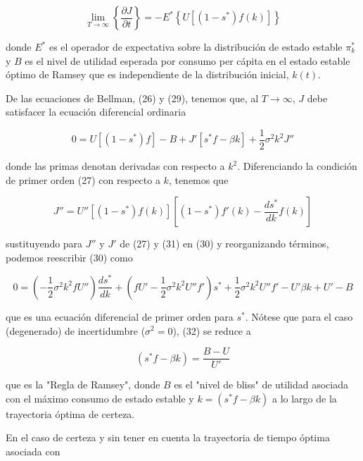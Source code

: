 \documentclass[a4paper,12pt]{article}
\begin{document}
		\begin{equation}
\lim_{T \to \infty} \left\{ \frac{\partial J}{\partial t} \right\} = -E^* \left\{ U[(1 - s^*)f(k)] \right\}
		\end{equation}

donde \( E^* \) es el operador de expectativa sobre la distribución de estado estable \( \pi_k^* \) y \( B \) es el nivel de utilidad esperada por consumo per cápita en el estado estable óptimo de Ramsey que es independiente de la distribución inicial, \( k(t) \).

De las ecuaciones de Bellman, (26) y (29), tenemos que, al \( T \to \infty \), \( J \) debe satisfacer la ecuación diferencial ordinaria

		\begin{equation}
0 = U[(1 - s^*)f] - B + J' [s^* f - \beta k] + \frac{1}{2} \sigma^2 k^2 J''
		\end{equation}

donde las primas denotan derivadas con respecto a \( k^2 \). Diferenciando la condición de primer orden (27) con respecto a \( k \), tenemos que

		\begin{equation}
J'' = U''[(1 - s^*)f(k)] [(1 - s^*)f'(k) - \frac{d s^*}{d k} f(k)]
		\end{equation}

sustituyendo para \( J'' \) y \( J' \) de (27) y (31) en (30) y reorganizando términos, podemos reescribir (30) como

		\begin{equation}
0 = (- \frac{1}{2} \sigma^2 k^2 f U'') \frac{d s^*}{d k} + (f U' - \frac{1}{2} \sigma^2 k^2 U'' f') s^* + \frac{1}{2} \sigma^2 k^2 U'' f' - U' \beta k + U' - B
		\end{equation}

que es una ecuación diferencial de primer orden para \( s^* \). Nótese que para el caso (degenerado) de incertidumbre (\( \sigma^2 = 0 \)), (32) se reduce a

		\begin{equation}
(s^* f - \beta k) = \frac{B - U}{U'}
		\end{equation}

que es la "Regla de Ramsey", donde \( B \) es el "nivel de bliss" de utilidad asociada con el máximo consumo de estado estable y \( k = (s^* f - \beta k) \) a lo largo de la trayectoria óptima de certeza.

En el caso de certeza y sin tener en cuenta la trayectoria de tiempo óptima asociada con
\end{document}
